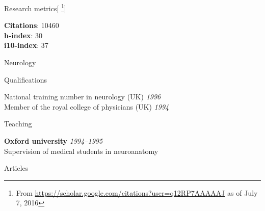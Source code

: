 \documentclass{cv}
\newcommand{\PlaceDateNote}[3]{{\bf #1} \hfill {\em #2} \\#3}
\begin{document}
\begin{cvSection}{Research metrics}[
    \footnote{ From
    \url{https://scholar.google.com/citations?user=q12RP7AAAAAJ} as of July 7,
2016}]

{\bf Citations}: 10460 \\
{\bf h-index}: 30 \\
{\bf i10-index}: 37

\end{cvSection}

\begin{cvSection}{Neurology}

\begin{cvSubSection}{Qualifications}

National training number in neurology (UK) \hfill {\em 1996} \\
Member of the royal college of physicians (UK) \hfill {\em 1994}

\end{cvSubSection}

\begin{cvSubSection}{Teaching}

\PlaceDateNote{Oxford university}{1994--1995}{
Supervision of medical students in neuroanatomy}

\end{cvSubSection}

\begin{cvSubSection}{Articles}

\printbibliography[heading=none,
    keyword=neurology,
notkeyword=omit]

\end{cvSubSection}

\end{cvSection}
\end{document}
